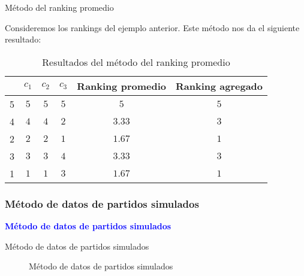\documentclass[10pt]{beamer}
\begin{document}
	\begin{frame}{Método del ranking promedio}
		\begin{ejemplo}
			Consideremos los rankings del ejemplo anterior. Este método nos da el siguiente resultado:
			
			\begin{table}[h]
				\centering
				\caption{Resultados del método del ranking promedio}
				\label{tbl:promedio_resultados}
				\begin{tabular}{@{}cccccc@{}}
					\cmidrule(l){2-6}
					& $c_1$ & $c_2$ & $c_3$ & Ranking promedio & Ranking agregado \\ \midrule
					5 & $5$    & $5$    & $5$    & $5$              & $5$              \\
					4 & $4$    & $4$    & $2$    & $3.33$           & $3$              \\
					2 & $2$    & $2$    & $1$    & $1.67$           & $1$              \\
					3 & $3$    & $3$    & $4$    & $3.33$           & $3$              \\
					1 & $1$    & $1$    & $3$    & $1.67$           & $1$              \\ \bottomrule
				\end{tabular}
			\end{table} 
		\end{ejemplo}
	\end{frame}
	
	\subsubsection{Método de datos de partidos simulados}
	
	\begin{frame}
		\begin{center}
			\Huge\textbf{\textsf{\textcolor{blue}{Método de datos de partidos simulados}}}
		\end{center}
	\end{frame}
	
	\begin{frame}{Método de datos de partidos simulados}
		\begin{figure}
			\centering
			\resizebox{.6\linewidth}{!}{\partidossimulados}
			\caption{Método de datos de partidos simulados}
			\label{fig:partidos_simulados}
		\end{figure}
	\end{frame}
	
\end{document}
